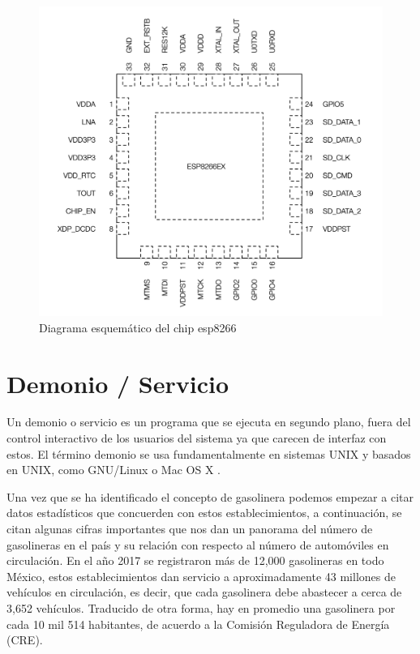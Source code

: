 \begin{figure}[H]
	\centering
	\includegraphics[scale=.25]{Capitulo2/images/esp8266.png}
	\caption{Diagrama esquemático del chip esp8266}
	\label{fig:diagrama_dispensador}
\end{figure}
\paragraph{}

\section{Demonio / Servicio}
Un demonio o servicio es un programa que se ejecuta en segundo plano, fuera del control interactivo de los usuarios del sistema ya que carecen de interfaz con estos. El término demonio se usa fundamentalmente en sistemas UNIX y basados en UNIX, como GNU/Linux o Mac OS X \citep{MarcoTeorico4}.

Una vez que se ha identificado el concepto de gasolinera podemos empezar a citar datos estadísticos que concuerden con estos establecimientos, a continuación, se citan algunas cifras importantes que nos dan un panorama del número de gasolineras en el país y su relación con respecto al número de automóviles en circulación. En el año 2017 se registraron más de 12,000 gasolineras en todo México, estos establecimientos dan servicio a aproximadamente 43 millones de vehículos en circulación, es decir,  que cada gasolinera debe abastecer a cerca de 3,652 vehículos.  Traducido de otra forma, hay en promedio una gasolinera por cada 10 mil 514 habitantes, de acuerdo a la Comisión Reguladora de Energía (CRE)\citep{MarcoTeorico2}.
